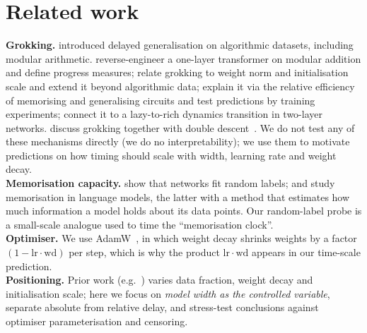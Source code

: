 \documentclass{article}
\begin{document}
\section{Related work}
\textbf{Grokking.} \citet{power2022grokking} introduced delayed generalisation on algorithmic datasets, including modular arithmetic.
\citet{nanda2023progress} reverse-engineer a one-layer transformer on modular addition and define progress measures; \citet{liu2023omnigrok} relate grokking to weight norm and
initialisation scale and extend it beyond algorithmic data; \citet{varma2023circuit} explain it via the relative efficiency of memorising and generalising circuits and
test predictions by training experiments; \citet{kumar2024grokking} connect it to a lazy-to-rich dynamics transition in two-layer networks.
\citet{davies2023unifying} discuss grokking together with double descent~\citep{nakkiran2020deep}. We do not test any of these mechanisms directly
(we do no interpretability); we use them to motivate predictions on how timing should scale with width, learning rate and weight decay.\\
\textbf{Memorisation capacity.} \citet{zhang2017rethinking} show that networks fit random labels; \citet{tirumala2022memorization} and \citet{morris2025memorize}
study memorisation in language models, the latter with a method that estimates how much information a model holds about its data points. Our random-label probe is a small-scale analogue used to time
the ``memorisation clock''. \\
\textbf{Optimiser.} We use AdamW~\citep{loshchilov2017decoupled}, in which weight decay shrinks weights by a factor $(1-\mathrm{lr}\cdot\mathrm{wd})$ per step, which is why the product $\mathrm{lr}\cdot\mathrm{wd}$ appears in our time-scale prediction.\\
\textbf{Positioning.} Prior work (e.g.\ \citealp{power2022grokking,liu2023omnigrok}) varies data fraction, weight decay and initialisation scale; here we focus on \emph{model width as the controlled variable}, separate absolute from relative delay, and
stress-test conclusions against optimiser parameterisation and censoring.
\end{document}
